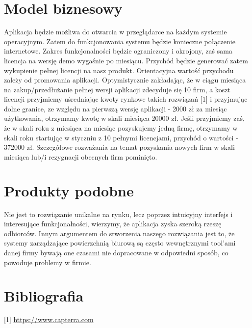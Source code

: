 \documentclass{article}
\begin{document}
\section{Model biznesowy}
\hspace{10mm} Aplikacja będzie możliwa do otwarcia w przeglądarce na każdym systemie operacyjnym. Zatem do funkcjonowania systemu będzie konieczne połączenie internetowe.
Zakres funkcjonalności będzie ograniczony i okrojony, zaś sama licencja na wersję demo wygaśnie po miesiącu. Przychód będzie generować zatem wykupienie pełnej licencji na nasz produkt.
Orientacyjna wartość przychodu zależy od promowania aplikacji. Optymistycznie zakładając, że w ciągu miesiąca na zakup/przedłużanie pełnej wersji aplikacji zdecyduje się 10 firm, a koszt licencji przyjmiemy uśredniając kwoty rynkowe takich rozwiązań [1] i przyjmując dolne granice, ze względu na pierwszą wersję aplikacji - 2000 zł za miesiąc użytkowania, otrzymamy kwotę w skali miesiąca 20000 zł. Jeśli przyjmiemy zaś, że w skali roku z miesiąca na miesiąc pozyskujemy jedną firmę, otrzymamy w skali roku startując w styczniu z 10 pełnymi licencjami, przychód o wartości - 372000 zł. Szczegółowe rozważania na temat pozyskania nowych firm w skali miesiąca lub/i rezygnacji obecnych firm pominięto.


\section{Produkty podobne}
\hspace{10mm}  Nie jest to rozwiązanie unikalne na rynku, lecz poprzez intuicyjny interfejs i interesujące funkcjonalności, wierzymy, że aplikacja zyska szeroką rzeszę odbiorców.
Innym argumentem do stworzenia naszego rozwiązania jest to, że systemy zarządzające powierzchnią biurową są często wewnętrznymi tool'ami danej firmy bywają one czasami nie dopracowane w odpowiedni sposób, co powoduje problemy w firmie.

\section*{Bibliografia}
[1] \href{https://www.capterra.com/p/117248/OfficeSpace-Software/#pricing}{https://www.capterra.com}
\end{document}
